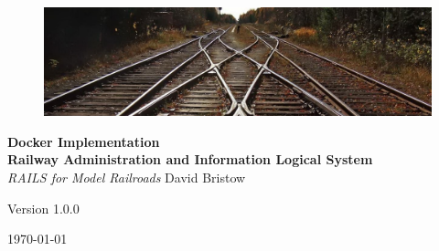 \documentclass[letterpaper, oneside, 11pt]{book}
\begin{document}
\begin{titlepage}
	\raggedleft
	\begin{figure}[H]
	\centering
		\includegraphics[scale=1.53]{../System/railway_track.jpg}
	\label{fig:track}
\end{figure}
	\vspace*{0.167\textheight}
	\textbf{\LARGE Docker Implementation}\\[\baselineskip]
    \textbf{\textcolor{MyBlue}{\Huge R\Large ailway \Huge A\Large dministration and \Huge I\Large nformation \Huge L\Large ogical \Huge S\Large ystem}}\\[\baselineskip]
	{\Large \textit{RAILS for Model Railroads}}
	\vfill
    \vspace*{\baselineskip}
	{\small David Bristow}

	{\small Version 1.0.0}
	
	{\small \today}
	\vspace*{3\baselineskip}
\end{titlepage}
\tableofcontents






\backmatter

\end{document}

